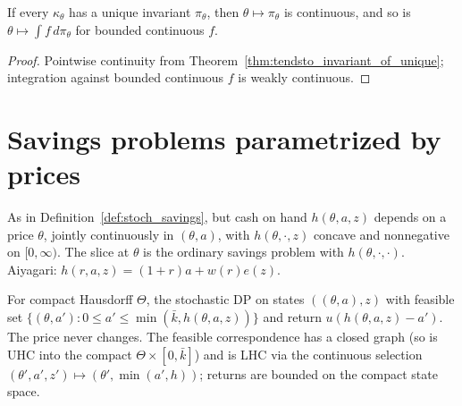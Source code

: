 \begin{corollary}
\label{cor:continuous_invariant}
\leanok
If every $\kappa_\theta$ has a unique invariant $\pi_\theta$, then $\theta\mapsto\pi_\theta$ is continuous, and so is
$\theta \mapsto \int f\,d\pi_\theta$ for bounded continuous $f$.
\end{corollary}
\begin{proof}
\leanok
{}
Pointwise continuity from Theorem~\ref{thm:tendsto_invariant_of_unique}; integration against bounded
continuous $f$ is weakly continuous.
\end{proof}

\section{Savings problems parametrized by prices}
\label{sec:param_savings}

\begin{definition}
\label{def:param_savings}
\leanok
{}
As in Definition~\ref{def:stoch_savings}, but cash on hand $h(\theta, a, z)$ depends on a price $\theta$,
jointly continuously in $(\theta,a)$, with $h(\theta,\cdot,z)$ concave and nonnegative on $[0,\infty)$. The slice
at $\theta$ is the ordinary savings problem with $h(\theta,\cdot,\cdot)$. Aiyagari: $h(r,a,z) = (1+r)a + w(r)e(z)$.
\end{definition}

\begin{definition}
\label{def:param_savings_aug}
\leanok
{}
For compact Hausdorff $\Theta$, the stochastic DP on states $((\theta,a),z)$ with feasible set
$\{(\theta,a') : 0\le a'\le\min(\bar k, h(\theta,a,z))\}$ and return $u(h(\theta,a,z) - a')$. The price never changes.
The feasible correspondence has a closed graph (so is UHC into the compact $\Theta\times[0,\bar k]$) and is LHC
via the continuous selection $(\theta', a', z') \mapsto (\theta', \min(a', h))$; returns are bounded on the compact
state space.
\end{definition}

